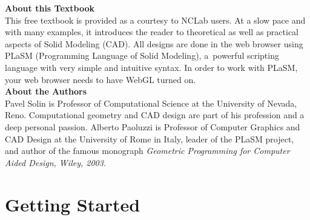 \documentclass{article}
\begin{document}

\vbox{}
\vfill
{
\noindent
{\bf About this Textbook}\\[4mm]
This free textbook is provided as a courtesy to NCLab users. At a slow pace
and with many examples, it introduces the reader to theoretical as well as
practical aspects of Solid Modeling (CAD). All designs are done in the web 
browser using PLaSM (Programming Language of Solid Modeling), a~powerful 
scripting language with very simple and intuitive syntax. In order to work 
with PLaSM, your web browser needs to have WebGL turned on.\\[12mm]

\noindent
{\bf About the Authors}\\[4mm]
Pavel Solin is Professor of Computational Science at the University of Nevada, Reno. 
Computational geometry and CAD design are part of his profession and a deep personal 
passion. Alberto Paoluzzi is Professor of Computer Graphics and CAD Design at the 
University of Rome in Italy, leader of the PLaSM project, and author of the famous 
monograph {\em Geometric Programming for Computer Aided Design, Wiley, 2003}.\\[12mm]

%
%
}
\vfill


\newpage
\setcounter{tocdepth}{2}
\tableofcontents


\newpage

\pagestyle{plain}
\setcounter{page}{1}

\section{Getting Started}
\end{document}
